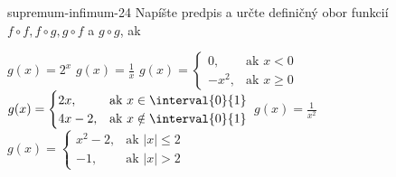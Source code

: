 \begin{defproblem}{supremum-infimum-24}
Napíšte predpis a určte definičný obor funkcií $f \circ f,f \circ g,g \circ f$
a $g \circ g$, ak
\begin{tasks}
  \task
    $g(x) = 2^x$
  \task
    $g(x)=\frac{1}{x}$
  \task
    $g(x) =
      \begin{cases}
        0,    & \text{ak }  x < 0 \\
        -x^2, & \text{ak }  x \geq 0
      \end{cases}
    $
  \task
    $g(x) =
      \begin{cases}
        2x,     & \text{ak }  x \in \interval{0}{1} \\
        4x - 2, & \text{ak }  x \notin \interval{0}{1}
      \end{cases}
    $
  \task
    $g(x) = \frac{1}{x^2}$
  \task
    $g(x) =
      \begin{cases}
        x^2 - 2, & \text{ak }  |x| \leq 2 \\
        -1,      & \text{ak }  |x| > 2
      \end{cases}$
\end{tasks}
\end{defproblem}

